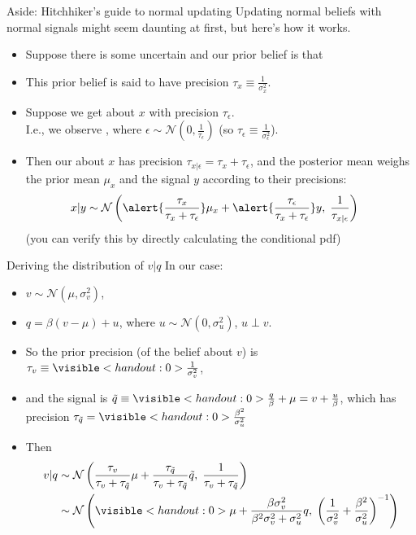 \documentclass[english,10pt
,aspectratio=169
]{beamer}
\begin{document}
\begin{frame}{Aside: Hitchhiker's guide to normal updating}
	Updating normal beliefs with normal signals might seem daunting at first, but here's how it works.
	\pause 
	\begin{itemize}
		\item Suppose there is some uncertain  and our prior belief is that \structure<1>{$x \sim \mathcal{N}(\mu_x, \sigma^2_x)$}
		\item This prior belief is said to have \alert<1>{precision $\tau_x \equiv \frac{1}{\sigma^2_x}$}.
		\pause 
		\item Suppose we get  about $x$ with \alert<2>{precision $\tau_\epsilon$}. 
		\\I.e., we observe , where $\epsilon \sim \mathcal{N}\left( 0, \frac{1}{\tau_\epsilon} \right)$ (so $\tau_\epsilon \equiv \frac{1}{\sigma^2_\epsilon}$).
		\pause 
		\item Then our  about $x$ has \alert{precision $\tau_{x|\epsilon} = \tau_x + \tau_\epsilon$}, and the posterior mean weighs the prior mean $\mu_x$ and the signal $y$ according to their precisions: 
		\begin{align*}
			x|y &\sim \mathcal{N} \left( \alert{\frac{\tau_x}{\tau_x + \tau_\epsilon}} \mu_x + \alert{\frac{\tau_\epsilon}{\tau_x + \tau_\epsilon}} y ,\; \frac{1}{\tau_{x|\epsilon}} \right)
		\end{align*}
		(you can verify this by directly calculating the conditional pdf)
	\end{itemize}
\end{frame}


\begin{frame}{Deriving the distribution of $v|q$}
	In our case:
	\begin{itemize}
		\item $v \sim \mathcal{N}(\mu, \sigma^2_v)$,
		\item $q=\beta(v-\mu) + u$, where $u \sim \mathcal{N}(0, \sigma^2_u)$, $u \perp v$.
		\pause \medskip 
		\item So the prior precision (of the belief about $v$) is $\tau_v \equiv \visible<handout:0>{\frac{1}{\sigma^2_v}}$, 
		\item and the signal is $\tilde{q} \equiv \visible<handout:0>{\frac{q}{\beta} + \mu = v + \frac{u}{\beta}}$, which has precision $\tau_{\tilde{q}} = \visible<handout:0>{\frac{\beta^2}{\sigma^2_u}}$
		\pause \medskip 
		\item Then 
		\begin{align*}
			v|q & \sim \mathcal{N} \left( \frac{\tau_v}{\tau_v + \tau_{\tilde{q}}} \mu + \frac{\tau_{\tilde{q}}}{\tau_v + \tau_{\tilde{q}}} \tilde{q} ,\; \frac{1}{\tau_v + \tau_{\tilde{q}}} \right)
			\\
			& \sim \mathcal{N} \left( \visible<handout:0>{\mu + \frac{\beta \sigma^2_v}{\beta^2 \sigma^2_v + \sigma^2_u} q,\; \left( \frac{1}{\sigma^2_v}+\frac{\beta^2}{\sigma^2_u} \right)^{-1} } \right)
		\end{align*}
	\end{itemize}
\end{frame}
\end{document}

